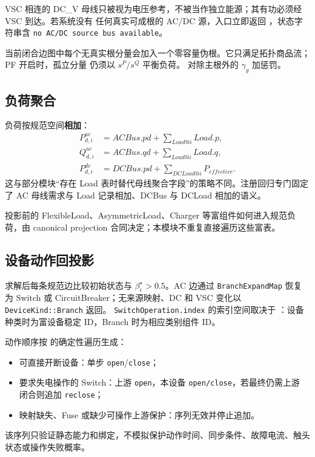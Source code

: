 VSC 相连的 DC\_V 母线只被视为电压参考，不被当作独立能源；其有功必须经 VSC 到达。若系统没有
任何真实可成根的 AC/DC 源，入口立即返回 ，状态字符串含
\texttt{no AC/DC source bus available}。

当前闭合边图中每个无真实根分量会加入一个零容量伪根。它只满足拓扑商品流；PF 开启时，孤立分量
仍须以 $s^P/s^Q$ 平衡负荷。 对除主根外的 $\gamma_g$ 加惩罚。

\subsection{负荷聚合}

负荷按规范空间\textbf{相加}：
\begin{align}
P_{d,i}^{ac}&=ACBus.pd+\sum_{Load@i}Load.p,\\
Q_{d,i}^{ac}&=ACBus.qd+\sum_{Load@i}Load.q,\\
P_{d,i}^{dc}&=DCBus.pd+\sum_{DCLoad@i}P_{effective}.
\end{align}
这与部分模块“存在 Load 表时替代母线聚合字段”的策略不同。注册回归专门固定了 AC 母线需求与
Load 记录相加、DCBus 与 DCLoad 相加的语义。

投影前的 FlexibleLoad、AsymmetricLoad、Charger 等富组件如何进入规范负荷，由 canonical
projection 合同决定；本模块不重复直接遍历这些富表。

\subsection{设备动作回投影}

求解后每条规范边比较初始状态与 $\beta_e^\star>0.5$。AC 边通过 \texttt{BranchExpandMap} 恢复为
Switch 或 CircuitBreaker；无来源映射、DC 和 VSC 变化以 \texttt{DeviceKind::Branch} 返回。
\texttt{SwitchOperation.index} 的索引空间取决于 ：设备种类时为富设备稳定 ID，Branch
时为相应类别组件 ID。

动作顺序按  的确定性遍历生成：
\begin{itemize}
  \item 可直接开断设备：单步 \texttt{open}/\texttt{close}；
  \item 要求失电操作的 Switch：上游 \texttt{open}，本设备 \texttt{open/close}，若最终仍需上游
        闭合则追加 \texttt{reclose}；
  \item 映射缺失、Fuse 或缺少可操作上游保护：序列无效并停止追加。
\end{itemize}
该序列只验证静态能力和绑定，不模拟保护动作时间、同步条件、故障电流、触头状态或操作失败概率。

